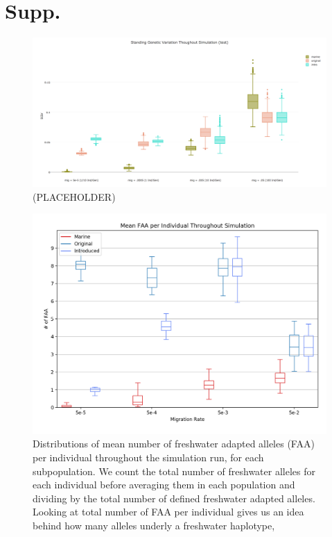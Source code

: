 \documentclass{article}
\begin{document}

{}

\clearpage
\appendix
\section{Supp.}

\begin{figure}
	\begin{center}
  		\includegraphics[width=\linewidth]{plotlyPlots/StandingGeneticVariation.png}
  		\caption{(PLACEHOLDER)}
		\label{fig:SGV}
	\end{center}
\end{figure}

\begin{figure}
	\begin{center}
  		\includegraphics[width=\linewidth]{matplotlibPlots/MFAI.png}
  		\caption{Distributions of mean number of freshwater adapted alleles (FAA) per individual throughout the simulation run, for each subpopulation.
		We count the total number of freshwater alleles for each individual before averaging them in each population and dividing by the total number of defined
		freshwater adapted alleles.
		Looking at total number of FAA per individual gives us an idea behind how many alleles underly a freshwater haplotype, 
		}
  		\label{fig:MNFAI}
	\end{center}
\end{figure}
\end{document}
